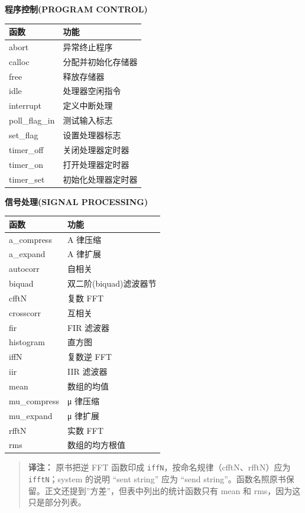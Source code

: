 \textbf{程序控制(PROGRAM CONTROL)}

{\def\LTcaptype{none} %
\begin{longtable}[]{@{}ll@{}}
\toprule\noalign{}
函数 & 功能 \\
\midrule\noalign{}
\endhead
\bottomrule\noalign{}
\endlastfoot
abort & 异常终止程序 \\
calloc & 分配并初始化存储器 \\
free & 释放存储器 \\
idle & 处理器空闲指令 \\
interrupt & 定义中断处理 \\
poll\_flag\_in & 测试输入标志 \\
set\_flag & 设置处理器标志 \\
timer\_off & 关闭处理器定时器 \\
timer\_on & 打开处理器定时器 \\
timer\_set & 初始化处理器定时器 \\
\end{longtable}
}

\textbf{信号处理(SIGNAL PROCESSING)}

{\def\LTcaptype{none} %
\begin{longtable}[]{@{}ll@{}}
\toprule\noalign{}
函数 & 功能 \\
\midrule\noalign{}
\endhead
\bottomrule\noalign{}
\endlastfoot
a\_compress & A 律压缩 \\
a\_expand & A 律扩展 \\
autocorr & 自相关 \\
biquad & 双二阶(biquad)滤波器节 \\
cfftN & 复数 FFT \\
crosscorr & 互相关 \\
fir & FIR 滤波器 \\
histogram & 直方图 \\
iffN & 复数逆 FFT \\
iir & IIR 滤波器 \\
mean & 数组的均值 \\
mu\_compress & μ 律压缩 \\
mu\_expand & μ 律扩展 \\
rfftN & 实数 FFT \\
rms & 数组的均方根值 \\
\end{longtable}
}

\begin{quote}
\textbf{译注：} 原书把逆 FFT 函数印成
\texttt{iffN}，按命名规律（cfftN、rfftN）应为 \texttt{ifftN}；system
的说明 ``sent string'' 应为 ``send
string''。函数名照原书保留。正文还提到''方差''，但表中列出的统计函数只有
mean 和 rms，因为这只是部分列表。
\end{quote}

